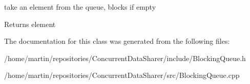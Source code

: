 take an element from the queue, blocks if empty 

\begin{DoxyReturn}{Returns}
element 
\end{DoxyReturn}


The documentation for this class was generated from the following files\+:\begin{DoxyCompactItemize}
\item 
/home/martin/repositories/\+Concurrent\+Data\+Sharer/include/Blocking\+Queue.\+h\item 
/home/martin/repositories/\+Concurrent\+Data\+Sharer/src/Blocking\+Queue.\+cpp\end{DoxyCompactItemize}
